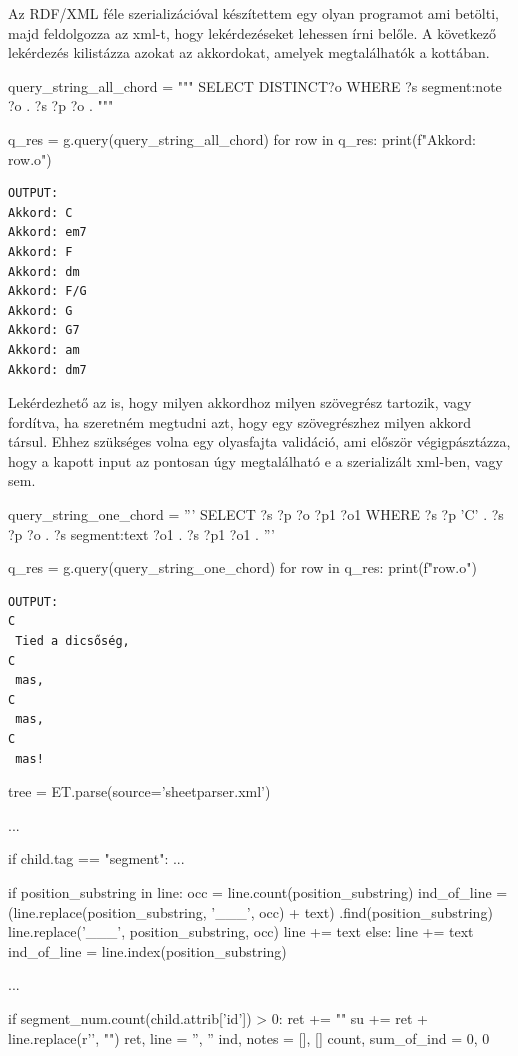 Az RDF/XML féle szerializációval készítettem egy olyan programot ami betölti, majd feldolgozza az xml-t, hogy lekérdezéseket lehessen írni belőle. A következő lekérdezés kilistázza azokat az akkordokat, amelyek megtalálhatók a kottában.

\begin{python}
query_string_all_chord = """
    SELECT DISTINCT?o
    WHERE {
        ?s segment:note ?o .
        ?s ?p ?o .
    }
"""

q_res = g.query(query_string_all_chord)
for row in q_res:
    print(f"Akkord: {row.o}")
\end{python}
\begin{verbatim}
OUTPUT:
Akkord: C
Akkord: em7
Akkord: F
Akkord: dm
Akkord: F/G
Akkord: G
Akkord: G7
Akkord: am
Akkord: dm7
\end{verbatim}

Lekérdezhető az is, hogy milyen akkordhoz milyen szövegrész tartozik, vagy fordítva, ha szeretném megtudni azt, hogy egy szövegrészhez milyen akkord társul. Ehhez szükséges volna egy olyasfajta validáció, ami először végigpásztázza, hogy a kapott input az pontosan úgy megtalálható e a szerializált xml-ben, vagy sem.

\begin{python}
query_string_one_chord = '''
    SELECT ?s ?p ?o ?p1 ?o1
    WHERE {
        ?s ?p 'C' .
        ?s ?p ?o .
        ?s segment:text ?o1 .
        ?s ?p1 ?o1 .
    }
'''

q_res = g.query(query_string_one_chord)
for row in q_res:
    print(f"{row.o}")
\end{python}
\begin{verbatim}
OUTPUT:
C
 Tied a dicsőség, 
C
 mas, 
C
 mas, 
C
 mas!
\end{verbatim}


\begin{python}
tree = ET.parse(source='sheetparser.xml')

...

if child.tag == "segment":
	...
	
  if position_substring in line:
    occ = line.count(position_substring)
    ind_of_line = (line.replace(position_substring, '___', occ) + text)
      .find(position_substring)
    line.replace('___', position_substring, occ)
    line += text
  else:
    line += text
    ind_of_line = line.index(position_substring)
	            
     ...
     
  if segment_num.count(child.attrib['id']) > 0:
    ret += "\n"
    su += ret + line.replace(r'\n', "\n")
    ret, line = '', ''
    ind, notes = [], []
    count, sum_of_ind = 0, 0
\end{python}


